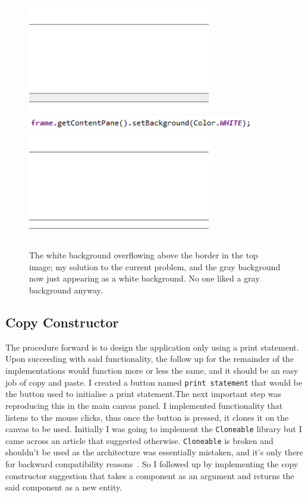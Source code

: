 \documentclass[a4paper, 12pt]{article}
\begin{document}
            \begin{figure}[h]
                \centering
                \includegraphics[width=80mm]{colour_overfill.png}
                \includegraphics[width=100mm]{overfill_solution.png}
                \includegraphics[width=80mm]{no_overfill.png}
                \caption{The white background overflowing above the border in the top image; my solution
                to the current problem, and the gray background now just appearing as a white background.
                No one liked a gray background anyway.}
            \end{figure}
        
        \clearpage
        \subsection{Copy Constructor}
            The procedure forward is to design the application only using a print statement. Upon
            succeeding with said functionality, the follow up for the remainder of the implementations
            would function more or less the same, and it should be an easy job of copy and paste.
            I created a button named \texttt{print statement} that would be the button used to initialise
            a print statement.The next important step was reproducing this in the main canvas panel.
            I implemented functionality that listens to the mouse clicks, thus once the button is
            pressed, it clones it on the canvas to be used. Initially I was going to implement the
            \texttt{Cloneable} library but I came across an article that suggested otherwise.
            \texttt{Cloneable} is broken and shouldn't be used as the architecture was essentially
            mistaken, and it's only there for backward compatibility reasons~\cite{billVenners}. So I followed up
            by implementing the copy constructor suggestion that takes a component as an argument and
            returns the said component as a new entity. \\
\end{document}
